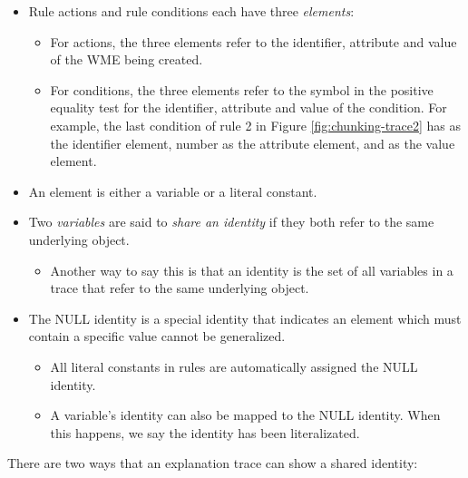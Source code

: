 \begin{itemize}
	\item Rule actions and rule conditions each have three \textit{elements}:
	\vspace{-6pt}
	\begin{itemize}
		\item For actions, the three elements refer to the identifier, attribute and value of the WME being created.
		\vspace{-6pt}
		\item For conditions, the three elements refer to the symbol in the positive equality test for the identifier, attribute and value of the condition.  For example, the last condition of rule 2 in Figure \ref{fig:chunking-trace2} has  as the identifier element, number as the attribute element, and  as the value element.
	\end{itemize}
	\vspace{-6pt}
	\item An element is either a variable or a literal constant.
	\vspace{-6pt}
	\item Two \textit{variables} are said to \textit{share an identity} if they both refer to the same underlying object.
	\vspace{-6pt}
	\begin{itemize}
		\item Another way to say this is that an identity is the set of all variables in a trace that refer to the same underlying object.
	\end{itemize}
	\vspace{-6pt}
	\item The NULL identity is a special identity that indicates an element which must contain a specific value cannot be generalized.
	\vspace{-6pt}
	\begin{itemize}
		\item All literal constants in rules are automatically assigned the NULL identity.
		\vspace{-6pt}
		\item A variable's identity can also be mapped to the NULL identity.  When this happens, we say the identity has been literalizated.
	\end{itemize}
	\vspace{-6pt}
\end{itemize}

There are two ways that an explanation trace can show a shared identity:

